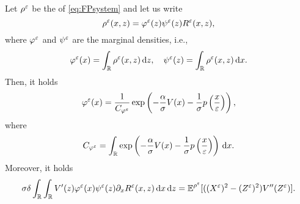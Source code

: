 \documentclass[10pt]{article}
\begin{document}
\begin{lemma}\label{lem:FPMarginal} Let $\rho^\varepsilon$ be the  of \eqref{eq:FPsystem} and let us write 
\begin{equation}\label{eq:densityDecomposition}
	\rho^\varepsilon(x, z) = \varphi^\varepsilon(z)\psi^\varepsilon(z)R^\varepsilon(x,z),
\end{equation}
where $\varphi^\varepsilon$ and $\psi^\varepsilon$ are the marginal densities, i.e., 
\begin{equation}
	\varphi^\varepsilon(x) = \int_{\mathbb{R}} \rho^\varepsilon(x,z) \,\mathrm{d} z, \quad  \psi^\varepsilon(z) = \int_{\mathbb{R}} \rho^\varepsilon(x,z) \,\mathrm{d} x.
\end{equation}
Then, it holds
\begin{equation}\label{eq:marginalX}
	\varphi^\varepsilon(x) = \frac{1}{C_{\varphi^\varepsilon}} \exp\left(- \frac{\alpha}{\sigma} V(x) - \frac{1}{\sigma} p \left ( \frac{x}{\varepsilon} \right )\right),
\end{equation}
where
\begin{equation}
	C_{\varphi^\varepsilon} = \int_{\mathbb{R}} \exp\left(- \frac{\alpha}{\sigma} V(x) - \frac{1}{\sigma} p \left ( \frac{x}{\varepsilon} \right )\right) \,\mathrm{d} x.
\end{equation}
Moreover, it holds
\begin{equation}
	\sigma \delta \int_{\mathbb{R}} \int_{\mathbb{R}} V'(z) \varphi^\varepsilon(x) \psi^\varepsilon(z) \partial_x R^\varepsilon(x,z) \,\mathrm{d} x \,\mathrm{d} z = \operatorname{\mathbb{E}}^{\rho^\varepsilon}[((X^\varepsilon)^2 - (Z^\varepsilon)^2)V''(Z^\varepsilon)].
\end{equation}
\end{lemma}
\end{document}
